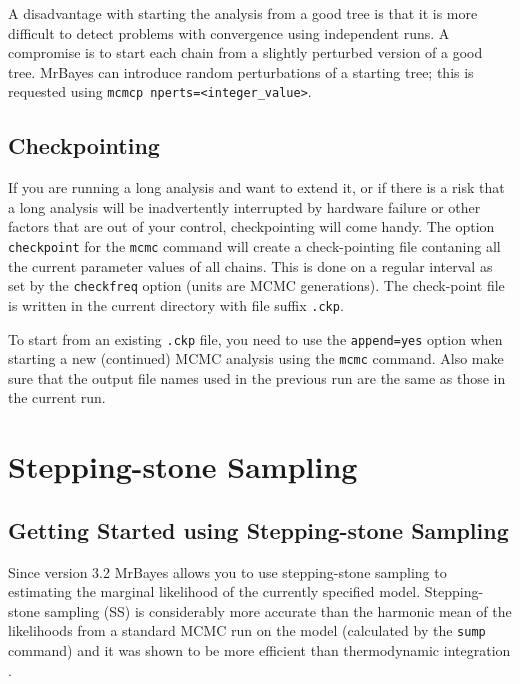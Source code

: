 \documentclass[12pt]{book}
\newcommand{\ttt}[1]{\texttt{#1}}
\begin{document}
A disadvantage with starting the analysis from a good tree is that it is more difficult to detect
problems with convergence using independent runs. A compromise is to start each chain from a
slightly perturbed version of a good tree. MrBayes can introduce random perturbations of a starting
tree; this is requested using \ttt{mcmcp nperts=<integer\_value>}.

\subsection{Checkpointing}
\label{checkpointing}

If you are running a long analysis and want to extend it, or if there is a risk that a long
analysis will be inadvertently interrupted by hardware failure or other factors that are out of
your control, checkpointing will come handy. The option \ttt{checkpoint} for the \ttt{mcmc} command
will create a check-pointing file contaning all the current parameter values of all chains. This
is done on a regular interval as set by the \ttt{checkfreq} option (units are MCMC generations).
The check-point file is written in the current directory with file suffix \ttt{.ckp}.

To start from an existing \ttt{.ckp} file, you need to use the \ttt{append=yes} option when
starting a new (continued) MCMC analysis using the \ttt{mcmc} command. Also make sure that the
output file names used in the previous run are the same as those in the current run.

\section{Stepping-stone Sampling}

\subsection{Getting Started using Stepping-stone Sampling}

Since version 3.2 MrBayes allows you to use stepping-stone sampling \citep{xie11} to estimating the
marginal likelihood of the currently specified model. Stepping-stone sampling (SS) is considerably
more accurate than the harmonic mean of the likelihoods from a standard MCMC run on the model
(calculated by the \ttt{sump} command) and it was shown to be more efficient than thermodynamic
integration \citep{xie11}.
\end{document}
